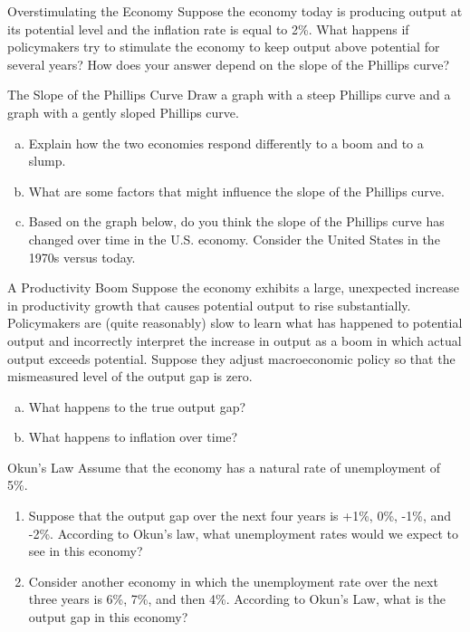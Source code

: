 \documentclass[8pt]{extarticle}
\title{}
\author{Avinash Iyer}
\date{}
\begin{document}
  \begin{problem}{Overstimulating the Economy}
    Suppose the economy today is producing output at its potential level and the inflation rate is equal to 2\%. What happens if policymakers try to stimulate the economy to keep output above potential for several years? How does your answer depend on the slope of the Phillips curve?
  \end{problem}
  \begin{problem}{The Slope of the Phillips Curve}
    Draw a graph with a steep Phillips curve and a graph with a gently sloped Phillips curve.
    \begin{enumerate}[(a)]
      \item Explain how the two economies respond differently to a boom and to a slump.
      \item What are some factors that might influence the slope of the Phillips curve.
      \item Based on the graph below, do you think the slope of the Phillips curve has changed over time in the U.S. economy. Consider the United States in the 1970s versus today.
    \end{enumerate}
  \end{problem}
  \begin{problem}{A Productivity Boom}
    Suppose the economy exhibits a large, unexpected increase in productivity growth that causes potential output to rise substantially. Policymakers are (quite reasonably) slow to learn what has happened to potential output and incorrectly interpret the increase in output as a boom in which actual output exceeds potential. Suppose they adjust macroeconomic policy so that the mismeasured level of the output gap is zero.
    \begin{enumerate}[(a)]
      \item What happens to the true output gap?
      \item What happens to inflation over time?
    \end{enumerate}
  \end{problem}
  \begin{problem}{Okun's Law}
    Assume that the economy has a natural rate of unemployment of 5\%.
    \begin{enumerate}
      \item Suppose that the output gap over the next four years is +1\%, 0\%, -1\%, and -2\%. According to Okun’s law, what unemployment rates would we expect to see in this economy?
      \item Consider another economy in which the unemployment rate over the next three years is 6\%, 7\%, and then 4\%. According to Okun’s Law, what is the output gap in this economy?
    \end{enumerate}
  \end{problem}
\end{document}
